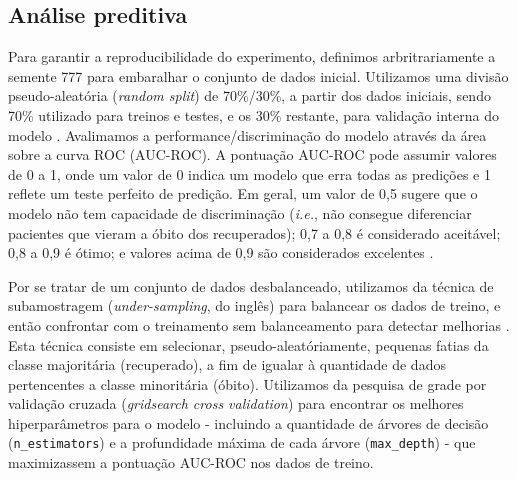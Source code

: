 
\subsection{Análise preditiva}


Para garantir a reproducibilidade do experimento, definimos arbritrariamente a semente 777 para embaralhar o conjunto de dados inicial. Utilizamos uma divisão pseudo-aleatória (\textit{random split}) de 70\%/30\%, a partir dos dados iniciais, sendo 70\% utilizado para treinos e testes, e os 30\% restante, para validação interna do modelo \cite{james2013statistical}. 
Avalimamos a performance/discriminação do modelo através da área sobre a curva ROC (AUC-ROC). A pontuação AUC-ROC pode assumir valores de 0 a 1, onde um valor de 0 indica um modelo que erra todas as predições e 1 reflete um teste perfeito de predição. Em geral, um valor de 0,5 sugere que o modelo não tem capacidade de discriminação (\textit{i.e.}, não consegue diferenciar pacientes que vieram a óbito dos recuperados); 0,7 a 0,8 é considerado aceitável; 0,8 a 0,9 é ótimo; e valores acima de 0,9 são considerados excelentes \cite{mandrekar2010receiver}.

Por se tratar de um conjunto de dados desbalanceado, utilizamos da técnica de subamostragem (\textit{under-sampling}, do inglês) para balancear os dados de treino, e então confrontar com o treinamento sem balanceamento para detectar melhorias \cite{anand2010approach}. Esta técnica consiste em selecionar, pseudo-aleatóriamente, pequenas fatias da classe majoritária (recuperado), a fim de igualar à quantidade de dados pertencentes a classe minoritária (óbito). Utilizamos da pesquisa de grade por validação cruzada (\textit{gridsearch cross validation}) para encontrar os melhores hiperparâmetros para o modelo - incluindo a quantidade de árvores de decisão (\texttt{n\_estimators}) e a profundidade máxima de cada árvore (\texttt{max\_depth}) \cite{krstajic2014cross} - que maximizassem a pontuação AUC-ROC nos dados de treino.

